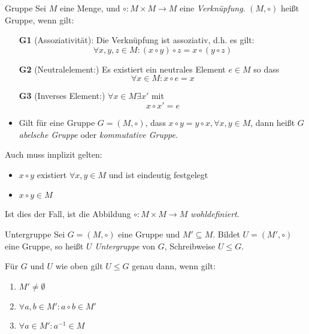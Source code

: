 \documentclass[german]{../spicker}
\begin{document}
\begin{defi}{Gruppe}
    Sei $M$ eine Menge, und $\circ: M \times M \to M$ eine \emph{Verknüpfung}.
    $(M, \circ)$ heißt Gruppe, wenn gilt:
    \begin{itemize}
        \item[\textbf{G1}] (Assoziativität): Die Verknüpfung ist assoziativ, d.h. es gilt:
            $$
                \forall x, y, z \in M : (x \circ y) \circ z = x \circ (y \circ z)
            $$
        \item[\textbf{G2}] (Neutralelement:) Es existiert ein neutrales Element $e \in M$ so dass
            $$
                \forall x \in M : x \circ e = x
            $$
        \item[\textbf{G3}] (Inverses Element:) $\forall x \in M \exists x'$ mit
            $$
                x \circ x' = e
            $$
        \item Gilt für eine Gruppe $G = (M, \circ)$, dass $x \circ y = y\circ x, \forall x, y \in M$, dann heißt $G$ \emph{abelsche Gruppe} oder \emph{kommutative Gruppe}.
    \end{itemize}

    Auch muss implizit gelten:
    \begin{itemize}
        \item $x \circ y$ existiert $\forall x, y \in M$ und ist eindeutig festgelegt
        \item $x \circ y \in M$
    \end{itemize}
    Ist dies der Fall, ist die Abbildung $\circ: M \times M \to M$ \emph{wohldefiniert}.
\end{defi}

\begin{defi}{Untergruppe}
    Sei $G = (M, \circ)$ eine Gruppe und $M' \subseteq M$. Bildet $U = (M', \circ)$ eine Gruppe, so heißt $U$ \emph{Untergruppe} von $G$, Schreibweise $U \leq G$.

    Für $G$ und $U$ wie oben gilt $U \leq G$ genau dann, wenn gilt:
    \begin{enumerate}
        \item $M'\neq \emptyset$
        \item $\forall a, b \in M' : a\circ b \in M'$
        \item $\forall a \in M': a^{-1} \in M$
    \end{enumerate}
\end{defi}

\newpage
\end{document}
